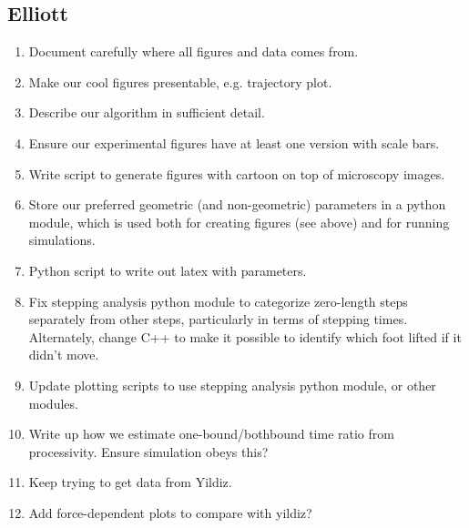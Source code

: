 \documentclass[9pt,twocolumn,twoside]{pnas-new}
\begin{document}
\subsection{Elliott}
\begin{enumerate}
\item Document carefully where all figures and data comes from.
\item Make our cool figures presentable, e.g. trajectory plot.
\item Describe our algorithm in sufficient detail.
\item Ensure our experimental figures have at least one version with
  scale bars.
\item Write script to generate figures with cartoon on top of
  microscopy images.
\item Store our preferred geometric (and non-geometric) parameters in
  a python module, which is used both for creating figures (see above)
  and for running simulations.
\item Python script to write out latex with parameters.
\item Fix stepping analysis python module to categorize zero-length
  steps separately from other steps, particularly in terms of stepping
  times.  Alternately, change C++ to make it possible to identify
  which foot lifted if it didn't move.
\item Update plotting scripts to use stepping analysis python module,
  or other modules.
\item Write up how we estimate one-bound/bothbound time ratio from
  processivity.  Ensure simulation obeys this?
\item Keep trying to get data from Yildiz.
\item Add force-dependent plots to compare with yildiz?
\end{enumerate}
\end{document}
